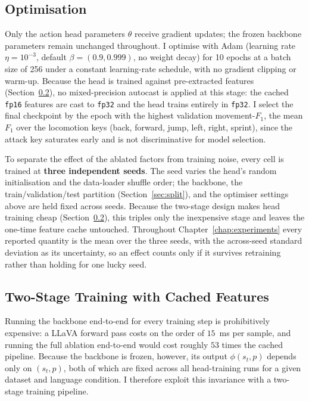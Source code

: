 \subsection{Optimisation}
Only the action head parameters $\theta$ receive gradient updates; the
frozen backbone parameters remain unchanged throughout. I optimise with Adam
(learning rate $\eta = 10^{-3}$, default $\beta = (0.9, 0.999)$, no weight
decay) for 10 epochs at a batch size of 256 under a constant learning-rate
schedule, with no gradient clipping or warm-up. Because the head is trained
against pre-extracted features (Section~\ref{caching}), no mixed-precision
autocast is applied at this stage: the cached \texttt{fp16} features are cast
to \texttt{fp32} and the head trains entirely in \texttt{fp32}. I select the
final checkpoint by the epoch with the highest validation movement-$F_1$, the
mean $F_1$ over the locomotion keys (back, forward, jump, left, right,
sprint), since the attack key saturates early and is not discriminative for
model selection.

To separate the effect of the ablated factors from training noise, every cell is
trained at \textbf{three independent seeds}. The seed varies the head's random
initialisation and the data-loader shuffle order; the backbone, the
train/validation/test partition (Section~\ref{sec:split}), and the optimiser
settings above are held fixed across seeds. Because the two-stage design makes
head training cheap (Section~\ref{caching}), this triples only the inexpensive
stage and leaves the one-time feature cache untouched. Throughout
Chapter~\ref{chap:experiments} every reported quantity is the mean over the three
seeds, with the across-seed standard deviation as its uncertainty, so an effect
counts only if it survives retraining rather than holding for one lucky seed.

\subsection{Two-Stage Training with Cached Features} \label{caching}
Running the backbone end-to-end for every training step is prohibitively
expensive: a LLaVA forward pass costs on the order of $15$~ms per sample,
and running the full ablation end-to-end would cost roughly $53$ times the
cached pipeline. Because the backbone is frozen, however, its output
$\phi(s_t, p)$ depends only on $(s_t, p)$, both of which are fixed across all
head-training runs for a given dataset and language condition. I therefore
exploit this invariance with a two-stage training pipeline.

